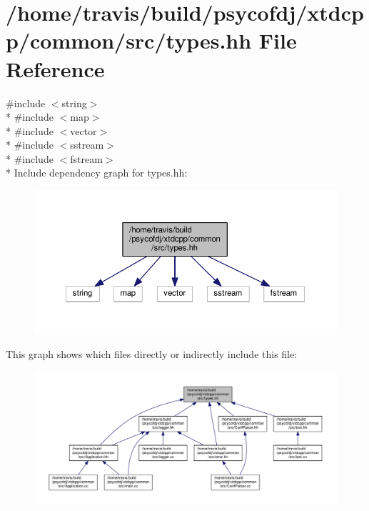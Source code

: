 \hypertarget{types_8hh}{\section{/home/travis/build/psycofdj/xtdcpp/common/src/types.hh File Reference}
\label{types_8hh}
}
{\ttfamily \#include $<$string$>$}\\*
{\ttfamily \#include $<$map$>$}\\*
{\ttfamily \#include $<$vector$>$}\\*
{\ttfamily \#include $<$sstream$>$}\\*
{\ttfamily \#include $<$fstream$>$}\\*
Include dependency graph for types.\-hh\-:
\nopagebreak
\begin{figure}[H]
\begin{center}
\leavevmode
\includegraphics[width=350pt]{types_8hh__incl}
\end{center}
\end{figure}
This graph shows which files directly or indirectly include this file\-:
\nopagebreak
\begin{figure}[H]
\begin{center}
\leavevmode
\includegraphics[width=350pt]{types_8hh__dep__incl}
\end{center}
\end{figure}
